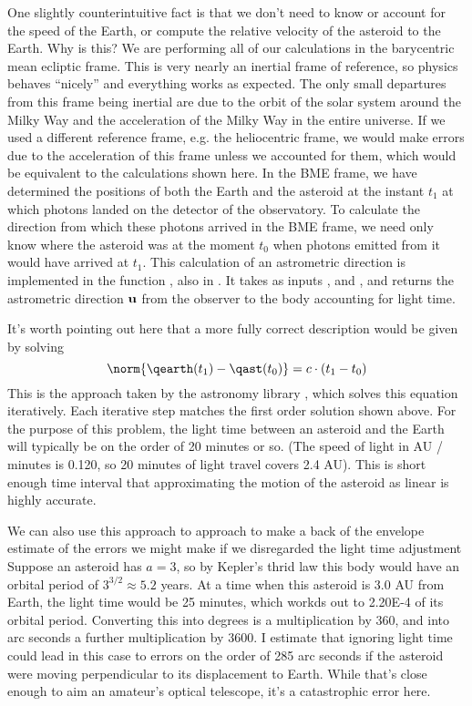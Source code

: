 One slightly counterintuitive fact is that we don't need to know or account for the speed of the Earth, 
or compute the relative velocity of the asteroid to the Earth. 
Why is this?
We are performing all of our calculations in the barycentric mean ecliptic frame.
This is very nearly an inertial frame of reference, so physics behaves ``nicely'' and everything works as expected.
The only small departures from this frame being inertial are due to the orbit of the solar system around the Milky Way
and the acceleration of the Milky Way in the entire universe.
If we used a different reference frame, e.g. the heliocentric frame, we would make errors due to the acceleration of this frame 
unless we accounted for them, which would be equivalent to the calculations shown here.
In the BME frame, we have determined the positions of both the Earth and the asteroid at the instant $t_1$ at which 
photons landed on the detector of the observatory.
To calculate the direction from which these photons arrived in the BME frame, we need only know where the asteroid was at the moment
$t_0$ when photons emitted from it would have arrived at $t_1$.
This calculation of an astrometric direction is implemented in the function , also in .
It takes as inputs ,  and , and returns the astrometric direction $\mathbf{u}$
from the observer to the body accounting for light time.

It's worth pointing out here that a more fully correct description would be given by solving
$$ \norm{\qearth(t_1) - \qast(t_0)} = c \cdot (t_1 - t_0) $$
This is the approach taken by the astronomy library , which solves this equation iteratively.
Each iterative step matches the first order solution shown above.
For the purpose of this problem, the light time between an asteroid and the Earth will typically be on the order of 20 minutes or so.
(The speed of light in AU / minutes is 0.120, so 20 minutes of light travel covers 2.4 AU).
This is short enough time interval that approximating the motion of the asteroid as linear is highly accurate.

We can also use this approach to approach to make a back of the envelope estimate of the errors we might make if 
we disregarded the light time adjustment
Suppose an asteroid has $a=3$, so by Kepler's thrid law this body would have an orbital period of $3^{3/2} \approx 5.2$ years.
At a time when this asteroid is 3.0 AU from Earth, the light time would be 25 minutes, which workds out to 2.20E-4 of its orbital period.
Converting this into degrees is a multiplication by 360, and into arc seconds a further multiplication by 3600.
I estimate that ignoring light time could lead in this case to errors on the order of 285 arc seconds 
if the asteroid were moving perpendicular to its displacement to Earth.
While that's close enough to aim an amateur's optical telescope, it's a catastrophic error here.

